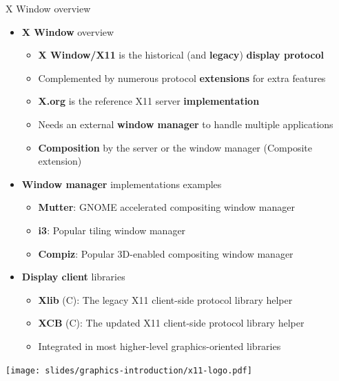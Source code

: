 \begin{frame}{X Window overview}
  \begin{itemize}
  \item \textbf{X Window} overview
    \begin{itemize}
    \item \textbf{X Window/X11} is the historical (and \textbf{legacy}) \textbf{display protocol}
    \item Complemented by numerous protocol \textbf{extensions} for extra features
    \item \textbf{X.org} is the reference X11 server \textbf{implementation}
    \item Needs an external \textbf{window manager} to handle multiple applications
    \item \textbf{Composition} by the server or the window manager (Composite extension)
    \end{itemize}
  \end{itemize}
  \begin{minipage}[b]{0.8\textwidth}
  \begin{itemize}
  \item \textbf{Window manager} implementations examples
    \begin{itemize}
    \item \textbf{Mutter}: GNOME accelerated compositing window manager
    \item \textbf{i3}: Popular tiling window manager
    \item \textbf{Compiz}: Popular 3D-enabled compositing window manager
    \end{itemize}
  \item \textbf{Display client} libraries
    \begin{itemize}
    \item \textbf{Xlib} (C): The legacy X11 client-side protocol library helper
    \item \textbf{XCB} (C): The updated X11 client-side protocol library helper
    \item Integrated in most higher-level graphics-oriented libraries
    \end{itemize}
  \end{itemize}
  \end{minipage}
  \begin{minipage}[b]{0.15\textwidth}
  \texttt{[image: slides/graphics-introduction/x11-logo.pdf]}
  \end{minipage}
\end{frame}

